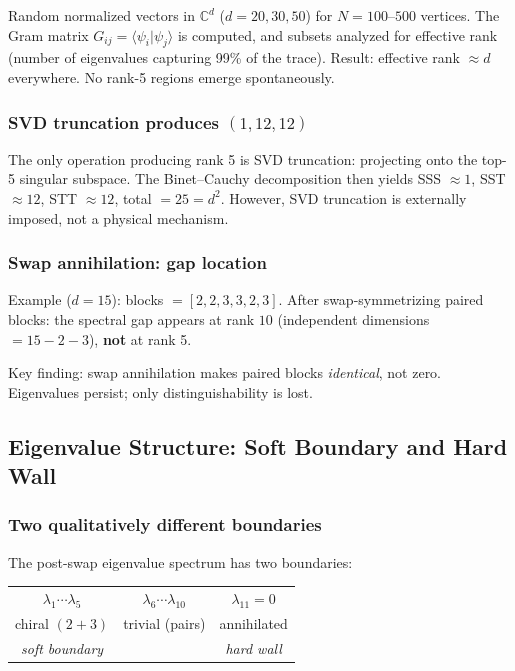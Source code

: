\documentclass[12pt]{article}
\theoremstyle{remark}
\theoremstyle{definition}
\newcommand{\CC}{\mathbb{C}}
\begin{document}
Random normalized vectors in $\CC^d$ ($d = 20, 30, 50$) for $N = 100$--$500$ vertices. The Gram matrix $G_{ij} = \langle\psi_i|\psi_j\rangle$ is computed, and subsets analyzed for effective rank (number of eigenvalues capturing 99\% of the trace). Result: effective rank $\approx d$ everywhere. No rank-5 regions emerge spontaneously.

\subsubsection{SVD truncation produces $(1, 12, 12)$}

The only operation producing rank 5 is SVD truncation: projecting onto the top-5 singular subspace. The Binet--Cauchy decomposition then yields SSS $\approx 1$, SST $\approx 12$, STT $\approx 12$, total $= 25 = d^2$. However, SVD truncation is externally imposed, not a physical mechanism.

\subsubsection{Swap annihilation: gap location}

Example ($d=15$): blocks $= [2, 2, 3, 3, 2, 3]$. After swap-symmetrizing paired blocks: the spectral gap appears at rank $10$ (independent dimensions $= 15 - 2 - 3$), \textbf{not} at rank 5.

Key finding: swap annihilation makes paired blocks \emph{identical}, not zero. Eigenvalues persist; only distinguishability is lost.

\subsection{Eigenvalue Structure: Soft Boundary and Hard Wall}

\subsubsection{Two qualitatively different boundaries}

The post-swap eigenvalue spectrum has two boundaries:

\begin{center}
\begin{tabular}{ccc}
$\lambda_1 \cdots \lambda_5$ & $\lambda_6 \cdots \lambda_{10}$ & $\lambda_{11} = 0$ \\
chiral $(2+3)$ & trivial (pairs) & annihilated \\
\emph{soft boundary} & & \emph{hard wall} \\
\end{tabular}
\end{center}
\end{document}
